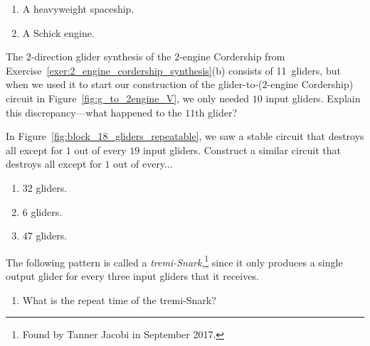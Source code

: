 \begin{multicols}{2}
\begin{problem}
\begin{enumerate}[label=\bf\color{ocre}(\alph*)]
		\item A heavyweight spaceship.
		
		\item A Schick engine. %
	\end{enumerate}
\end{problem}


\mfilbreak


\begin{problem}\label{fig:g_to_2engine_why_10_gliders}
	The $2$-direction glider synthesis of the $2$-engine Cordership from Exercise~\ref{exer:2_engine_cordership_synthesis}(b) consists of 11~gliders, but when we used it to start our construction of the glider-to-($2$-engine Cordership) circuit in Figure~\ref{fig:g_to_2engine_V}, we only needed $10$ input gliders. Explain this discrepancy---what happened to the $11$th glider?
\end{problem}


\mfilbreak


\begin{problem}\label{exer:stable_thin_out_gliders}
	In Figure~\ref{fig:block_18_gliders_repeatable}, we saw a stable circuit that destroys all except for $1$ out of every $19$ input gliders. Construct a similar circuit that destroys all except for $1$ out of every...\smallskip
	
	\begin{enumerate}[label=\bf\color{ocre}(\alph*)]
		\item $32$ gliders.
		
		\item $6$ gliders.
		
		\item $47$ gliders.
	\end{enumerate}
\end{problem}


\mfilbreak


\begin{problem}\label{exer:tremi_snark}
	The following pattern is called a \emph{tremi-Snark},\footnote{Found by Tanner Jacobi in September 2017.} since it only produces a single output glider for every three input gliders that it receives.
	
	\begin{center}
	\end{center}
	
	\begin{enumerate}[label=\bf\color{ocre}(\alph*)]
		\item What is the repeat time of the tremi-Snark?%
		

\end{enumerate}
\end{problem}
\end{multicols}
